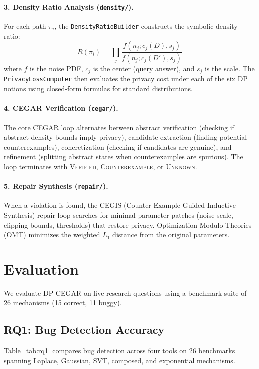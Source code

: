 \documentclass[sigplan,screen,nonacm]{acmart}
\begin{document}
\paragraph{3. Density Ratio Analysis (\texttt{density/}).}
For each path $\pi_i$, the \texttt{DensityRatioBuilder} constructs the symbolic
density ratio:
\[
  R(\pi_i) = \prod_j \frac{f(n_j; c_j(D), s_j)}{f(n_j; c_j(D'), s_j)}
\]
where $f$ is the noise PDF, $c_j$ is the center (query answer), and $s_j$ is
the scale. The \texttt{PrivacyLossComputer} then evaluates the privacy cost
under each of the six DP notions using closed-form formulas for standard
distributions.

\paragraph{4. CEGAR Verification (\texttt{cegar/}).}
The core CEGAR loop alternates between abstract verification (checking if
abstract density bounds imply privacy), candidate extraction (finding potential
counterexamples), concretization (checking if candidates are genuine), and
refinement (splitting abstract states when counterexamples are spurious). The
loop terminates with \textsc{Verified}, \textsc{Counterexample}, or
\textsc{Unknown}.

\paragraph{5. Repair Synthesis (\texttt{repair/}).}
When a violation is found, the CEGIS (Counter-Example Guided Inductive
Synthesis) repair loop searches for minimal parameter patches (noise scale,
clipping bounds, thresholds) that restore privacy. Optimization Modulo Theories
(OMT) minimizes the weighted $L_1$ distance from the original parameters.

\section{Evaluation}
\label{sec:eval}

We evaluate \textsc{DP-CEGAR} on five research questions using a benchmark
suite of 26 mechanisms (15 correct, 11 buggy).

\subsection{RQ1: Bug Detection Accuracy}

Table~\ref{tab:rq1} compares bug detection across four tools on 26 benchmarks
spanning Laplace, Gaussian, SVT, composed, and exponential mechanisms.
\end{document}
